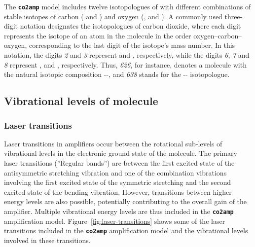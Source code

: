 The \textbf{\texttt{co2amp}} model includes twelve isotopologues of  with different combinations of stable isotopes of carbon ( and ) and oxygen (,  and ). A commonly used three-digit notation designates the isotopologues of carbon dioxide, where each digit represents the isotope of an atom in the molecule in the order oxygen–carbon–oxygen, corresponding to the last digit of the isotope's mass number. In this notation, the digits \textit{2} and \textit{3} represent  and , respectively, while the digits \textit{6}, \textit{7} and \textit{8} represent ,  and , respectively. Thus, \textit{626}, for instance, denotes a  molecule with the natural isotopic composition --, and \textit{638} stands for the -- isotopologue.




\subsection{Vibrational levels of  molecule}

\subsubsection{Laser transitions}

Laser transitions in  amplifiers occur between the rotational sub-levels of vibrational levels in the electronic ground state of the molecule. The primary laser transitions (''Regular bands'') are between the first excited state of the antisymmetric stretching vibration and one of the combination vibrations involving the first excited state of the symmetric stretching and the second excited state of the bending vibration. However, transitions between higher energy levels are also possible, potentially contributing to the overall gain of the amplifier. Multiple vibrational energy levels are thus included in the \textbf{\texttt{co2amp}} amplification model. Figure~\ref{fig:laser-transitions} shows some of the laser transitions included in the \textbf{\texttt{co2amp}} amplification model and the vibrational levels involved in these transitions.


